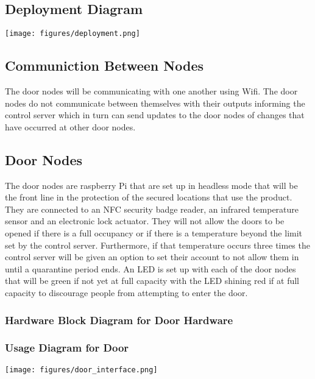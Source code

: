 \subsection{Deployment Diagram}

\texttt{[image: figures/deployment.png]}

\subsection{Communiction Between Nodes}
The door nodes will be communicating with one another using Wifi. The door nodes do
not communicate between themselves with their outputs informing the control server
which in turn can send updates to the door nodes of changes that have occurred
at other door nodes.

\subsection{Door Nodes}
The door nodes are raspberry Pi that are set up in headless mode that will be
the front line in the protection of the secured locations that use the product.
They are connected to an NFC security badge reader, an infrared
temperature sensor and an electronic lock actuator. They will
not allow the doors to be opened if there is a full occupancy or if there is a
temperature beyond the limit set by the control server. Furthermore, if that
temperature occurs three times the control server will be given an option to set
their account to not allow them in until a quarantine period ends. An LED is set
up with each of the door nodes that will be green if not yet at full capacity
with the LED shining red if at full capacity to discourage people from
attempting to enter the door.

\subsubsection{Hardware Block Diagram for Door Hardware}

\subsubsection{Usage Diagram for Door}

\texttt{[image: figures/door\_interface.png]}

